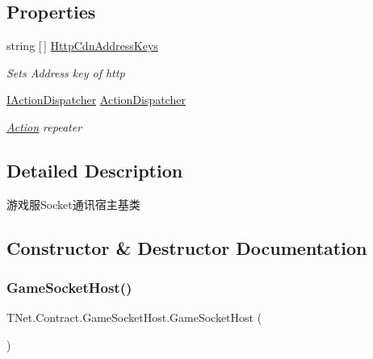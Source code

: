 \subsection*{Properties}
\begin{DoxyCompactItemize}
\item 
string \mbox{[}$\,$\mbox{]} \mbox{\hyperlink{class_t_net_1_1_contract_1_1_game_socket_host_aa3fd8ab07e95e70d3880fd5450041458}{Http\+Cdn\+Address\+Keys}}
\begin{DoxyCompactList}\small\item\em Sets Address key of http \end{DoxyCompactList}\item 
\mbox{\hyperlink{interface_t_net_1_1_contract_1_1_i_action_dispatcher}{I\+Action\+Dispatcher}} \mbox{\hyperlink{class_t_net_1_1_contract_1_1_game_socket_host_ada177e2eb10815cfb6151d16cee78c41}{Action\+Dispatcher}}
\begin{DoxyCompactList}\small\item\em \mbox{\hyperlink{namespace_t_net_1_1_contract_1_1_action}{Action}} repeater \end{DoxyCompactList}\end{DoxyCompactItemize}


\subsection{Detailed Description}
游戏服\+Socket通讯宿主基类 



\subsection{Constructor \& Destructor Documentation}
\mbox{\label{class_t_net_1_1_contract_1_1_game_socket_host_ad9064eb1e5ebea2df744ef988cbf9ecb}} 
\subsubsection{\texorpdfstring{Game\+Socket\+Host()}{GameSocketHost()}\hspace{0.1cm}{\footnotesize\ttfamily [1/2]}}
{\footnotesize\ttfamily T\+Net.\+Contract.\+Game\+Socket\+Host.\+Game\+Socket\+Host (\begin{DoxyParamCaption}{ }\end{DoxyParamCaption})\hspace{0.3cm}{\ttfamily [protected]}}





